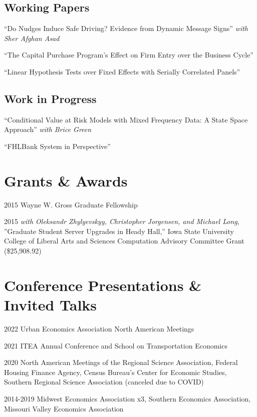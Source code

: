 \documentclass[letterpaper]{article}
\renewenvironment{itemize}{
  \begin{list}{}{
    \setlength{\leftmargin}{0em}
  }
}{
  \end{list}
}
\begin{document}
\subsection*{Working Papers}

\begin{itemize}
\item ``Do Nudges Induce Safe Driving? Evidence from Dynamic Message Signs'' \textit{with Sher Afghan Asad}
\item ``The Capital Purchase Program's Effect on Firm Entry over the Business Cycle''
\item ``Linear Hypothesis Tests over Fixed Effects with Serially Correlated Panels''

\subsection*{Work in Progress}
\item ``Conditional Value at Risk Models with Mixed Frequency Data: A State Space Approach'' \textit{with Brice Green}
\item ``FHLBank System in Perspective''
\end{itemize}




\section*{Grants \& Awards}


\begin{itemize}
\item 2015 Wayne W. Gross Graduate Fellowship
\item 2015 \textit{ with Oleksandr Zhylyevskyy, Christopher Jorgensen, and Michael Long}, ''Graduate Student Server Upgrades in Heady Hall,'' Iowa State University College of Liberal Arts and Sciences Computation Advisory Committee Grant (\$25,908.92)
\end{itemize}
\section*{Conference Presentations \& Invited Talks}


\begin{itemize}
\item 2022 Urban Economics Association North American Meetings
\item 2021 ITEA Annual Conference and School on Transportation Economics
\item 2020 North American Meetings of the Regional Science Association, Federal Housing Finance Agency, Census Bureau's Center for Economic Studies, Southern Regional Science Association (canceled due to COVID)
\item 2014-2019 Midwest Economics Association x3, Southern Economics Association, Missouri Valley Economics Association
\end{itemize}
\end{document}
